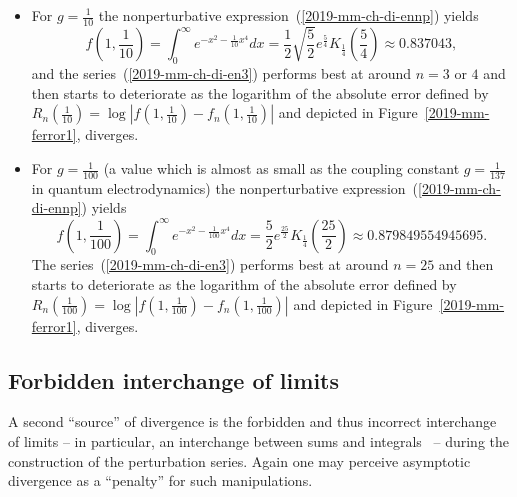 \begin{itemize}
\item For $g=\frac{1}{10}$   the nonperturbative expression~(\ref{2019-mm-ch-di-ennp}) yields
\begin{equation}
f\left(1,\frac{1}{10}\right)=\int_{0}^{\infty}e^{-x^{2}-\frac{1}{10}x^{4}}dx =\frac{1}{2}\sqrt{\frac{5}{2}}e^{\frac{5}{4}}K_{\frac{1}{4}}\left(\frac{5}{4}\right)\approx 0.837043  ,
\end{equation}
and
the series~(\ref{2019-mm-ch-di-en3})  performs best at around $n=3$ or $4$ and then starts to deteriorate
as the logarithm of the absolute error defined by
$R_n \left(\frac{1}{10}\right)=  \log \left| f \left(1,\frac{1}{10}\right)-f_n \left(1,\frac{1}{10}\right)\right| $
and depicted in Figure~\ref{2019-mm-ferror1}, diverges.
%
%

\item For $g=\frac{1}{100}$ (a value which is almost as small as the coupling constant $g=\frac{1}{137}$ in quantum electrodynamics)
the nonperturbative expression~(\ref{2019-mm-ch-di-ennp}) yields
\begin{equation}
f\left(1,\frac{1}{100}\right)
=\int_{0}^{\infty}e^{-x^{2}-\frac{1}{100}x^{4}}dx
=\frac{5}{2}e^{\frac{25}{2}}K_{\frac{1}{4}}\left(\frac{25}{2}\right)\approx 0.879 849 554 945 695
.
\end{equation}
The series~(\ref{2019-mm-ch-di-en3}) performs best at around $n=25$ and then starts to deteriorate
as the logarithm of the absolute error defined by
$R_n \left(\frac{1}{100}\right) =  \log \left| f \left(1,\frac{1}{100}\right)-f_n \left(1,\frac{1}{100}\right)\right| $
and depicted in Figure~\ref{2019-mm-ferror1}, diverges.
\end{itemize}


\subsection{Forbidden interchange of limits}

A second ``source'' of divergence is the forbidden and thus incorrect interchange of limits --
in particular, an interchange between sums and integrals~ --
during the construction of the perturbation series.
Again one may perceive asymptotic divergence as a ``penalty'' for such manipulations.

